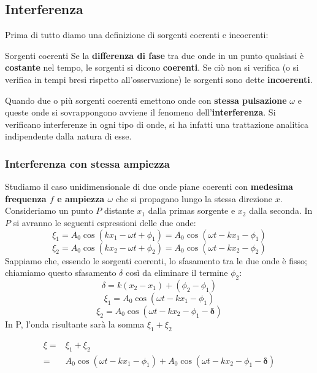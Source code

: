 \documentclass[x11names]{article}
\begin{document}
	
	\newpage
	\subsection{Interferenza}	
	Prima di tutto diamo una definizione di sorgenti coerenti e incoerenti:
	\begin{center}
		\colorbox{myblue}{\begin{minipage}{5.75in}
				\begin{blues}{Sorgenti coerenti}
					Se la \textbf{differenza di fase} tra due onde in un punto qualsiasi è \textbf{costante} nel tempo, le sorgenti si dicono \textbf{coerenti}. Se ciò non si verifica (o si verifica in tempi bresi rispetto all'osservazione) le sorgenti sono dette \textbf{incoerenti}.
				\end{blues}
		\end{minipage}}
	\end{center}
	Quando due o più sorgenti coerenti emettono onde con \textbf{stessa pulsazione} \(\omega\) e queste onde si sovrappongono avviene il fenomeno dell'\textbf{interferenza}. Si verificano interferenze in ogni tipo di onde, si ha infatti una trattazione analitica indipendente dalla natura di esse.
	
		\subsubsection{Interferenza con stessa ampiezza}
		Studiamo il caso unidimensionale di due onde piane coerenti con \textbf{medesima frequenza \(f\) e ampiezza \(\omega\)} che si propagano lungo la stessa direzione \(x\). Consideriamo un punto \(P\) distante \(x_1\) dalla primas sorgente e  \(x_2\) dalla seconda. In \(P\) si avranno le seguenti espressioni delle due onde:
		\[ 
		\xi_1 = A_0\cos\left(kx_1 -\omega t + \phi_1\right) = A_0\cos\left(\omega t - kx_1 - \phi_1\right)
		\]
		\[ 
		\xi_2 = A_0\cos\left(kx_2 -\omega t + \phi_2\right) = A_0\cos\left(\omega t - kx_2 - \phi_2\right)
		\]
		Sappiamo che, essendo le sorgenti coerenti, lo sfasamento tra le due onde è fisso; chiamiamo questo sfasamento \(\delta\) così da eliminare il termine \(\phi_2\):
		\[ 
		\boxed{\delta = k(x_2 - x_1) + (\phi_2-\phi_1)}
		\]
		\[ 
		\xi_1 = A_0\cos\left(\omega t - kx_1 - \phi_1\right)
		\]
		\[ 
		\xi_2 = A_0\cos\left(\omega t - kx_2 - \phi_1 - \boldsymbol{\delta}\right)
		\] 
		In P, l'onda risultante sarà la somma \(\xi _1 + \xi _2\)
		
		\begin{align*}
			\xi =& \xi_1 + \xi _2 \\
				=&  A_0\cos\left(\omega t - kx_1 - \phi_1\right) + A_0\cos\left(\omega t - kx_2 - \phi_1 - \boldsymbol{\delta}\right)
		\end{align*}
		
\end{document}
